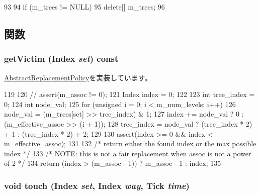 \begin{DoxyCode}
93 {
94     if (m_trees != NULL)
95         delete[] m_trees;
96 }
\end{DoxyCode}


\subsection{関数}
\hypertarget{classPseudoLRUPolicy_aad2c302009bdae8c2f86d7c4e0ed2c8f}{
\subsubsection[{getVictim}]{ getVictim ({\bf Index} {\em set}) const}}
\label{classPseudoLRUPolicy_aad2c302009bdae8c2f86d7c4e0ed2c8f}


\hyperlink{classAbstractReplacementPolicy_a100bd69954d47ece014cbd697a1f8d7f}{AbstractReplacementPolicy}を実装しています。


\begin{DoxyCode}
119 {
120     // assert(m_assoc != 0);
121     Index index = 0;
122 
123     int tree_index = 0;
124     int node_val;
125     for (unsigned i = 0; i < m_num_levels; i++){
126         node_val = (m_trees[set] >> tree_index) & 1;
127         index += node_val ? 0 : (m_effective_assoc >> (i + 1));
128         tree_index = node_val ? (tree_index * 2) + 1 : (tree_index * 2) + 2;
129     }
130     assert(index >= 0 && index < m_effective_assoc);
131 
132     /* return either the found index or the max possible index */
133     /* NOTE: this is not a fair replacement when assoc is not a power of 2 */
134     return (index > (m_assoc - 1)) ? m_assoc - 1 : index;
135 }
\end{DoxyCode}
\hypertarget{classPseudoLRUPolicy_a6d3ff52feacdaba90c7c0bfbe9f7f58a}{
\subsubsection[{touch}]{\setlength{\rightskip}{0pt plus 5cm}void touch ({\bf Index} {\em set}, \/  {\bf Index} {\em way}, \/  {\bf Tick} {\em time})}}
\label{classPseudoLRUPolicy_a6d3ff52feacdaba90c7c0bfbe9f7f58a}


